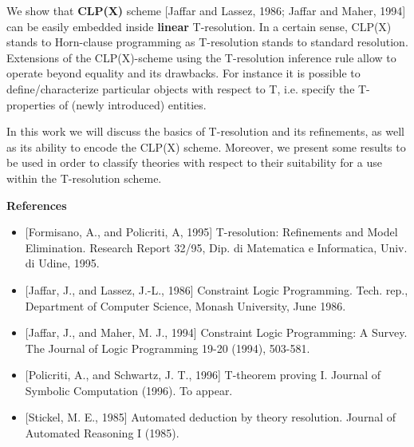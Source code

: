 We show that {\bf CLP(X)} scheme [Jaffar and Lassez, 1986; Jaffar and Maher,
1994] can be easily embedded inside {\bf linear} T-resolution. In a certain
sense, CLP(X) stands to Horn-clause programming as T-resolution stands
to standard resolution.  Extensions of the CLP(X)-scheme using the
T-resolution inference rule allow to operate beyond equality and its
drawbacks. For instance it is possible to define/characterize
particular objects with respect to T, i.e. specify the T-properties of
(newly introduced) entities.

In this work we will discuss the basics of T-resolution and its
refinements, as well as its ability to encode the CLP(X) scheme.
Moreover, we present some results to be used in order to classify
theories with respect to their suitability for a use within the
T-resolution scheme.

\bigskip
\noindent
{\bf References}

\begin{itemize}

\item

[Formisano, A., and Policriti, A, 1995] T-resolution: Refinements and Model Elimination.
    Research Report 32/95, Dip. di Matematica e Informatica, Univ. di Udine, 1995. 

\item

[Jaffar, J., and Lassez, J.-L., 1986] Constraint Logic Programming. Tech. rep., Department
    of Computer Science, Monash University, June 1986. 

\item

[Jaffar, J., and Maher, M. J., 1994] Constraint Logic Programming: A Survey. The Journal of
    Logic Programming 19-20 (1994), 503-581. 

\item

[Policriti, A., and Schwartz, J. T., 1996] T-theorem proving I. Journal of Symbolic
    Computation (1996). To appear. 

\item

[Stickel, M. E., 1985] Automated deduction by theory resolution. Journal of Automated
    Reasoning I (1985). 

\end{itemize}

